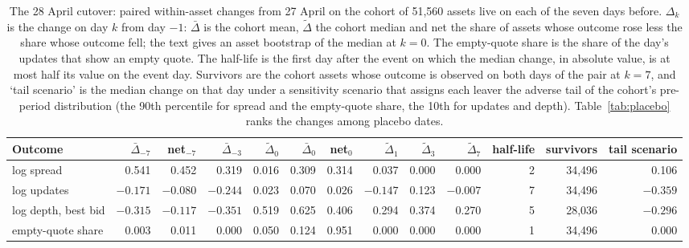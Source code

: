 \begin{table}[htbp]
\centering\scriptsize\setlength{\tabcolsep}{2.5pt}
\begin{tabular}{lrrrrrrrrrrrr}
\toprule
Outcome & $\bar\Delta_{-7}$ & net$_{-7}$ & $\bar\Delta_{-3}$ & $\tilde\Delta_0$ & $\bar\Delta_0$ & net$_0$ & $\tilde\Delta_1$ & $\tilde\Delta_3$ & $\tilde\Delta_7$ & half-life & survivors & tail scenario \\
\midrule
log spread & 0.541 & 0.452 & 0.319 & 0.016 & 0.309 & 0.314 & 0.037 & 0.000 & 0.000 & 2 & 34{,}496 & 0.106 \\
log updates & $-0.171$ & $-0.080$ & $-0.244$ & 0.023 & 0.070 & 0.026 & $-0.147$ & 0.123 & $-0.007$ & 7 & 34{,}496 & $-0.359$ \\
log depth, best bid & $-0.315$ & $-0.117$ & $-0.351$ & 0.519 & 0.625 & 0.406 & 0.294 & 0.374 & 0.270 & 5 & 28{,}036 & $-0.296$ \\
empty-quote share & 0.003 & 0.011 & 0.000 & 0.050 & 0.124 & 0.951 & 0.000 & 0.000 & 0.000 & 1 & 34{,}496 & 0.000 \\
\bottomrule
\end{tabular}
\caption{The 28 April cutover: paired within-asset changes from 27 April on the cohort of 51{,}560 assets live on each of the seven days before. $\Delta_k$ is the change on day $k$ from day $-1$: $\bar\Delta$ is the cohort mean, $\tilde\Delta$ the cohort median and net the share of assets whose outcome rose less the share whose outcome fell; the text gives an asset bootstrap of the median at $k=0$. The empty-quote share is the share of the day's updates that show an empty quote. The half-life is the first day after the event on which the median change, in absolute value, is at most half its value on the event day. Survivors are the cohort assets whose outcome is observed on both days of the pair at $k=7$, and `tail scenario' is the median change on that day under a sensitivity scenario that assigns each leaver the adverse tail of the cohort's pre-period distribution (the 90th percentile for spread and the empty-quote share, the 10th for updates and depth). Table~\ref{tab:placebo} ranks the changes among placebo dates.}
\label{tab:cutover}
\end{table}
